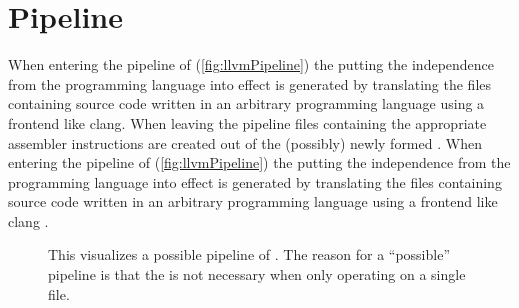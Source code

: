 \section{Pipeline}
When entering the pipeline of \llvm (\autoref{fig:llvmPipeline}) the \llvmir putting the independence from the programming language into effect is generated by translating the files containing source code written in an arbitrary programming language using a frontend like clang.
When leaving the pipeline files containing the appropriate assembler instructions are created out of the (possibly) newly formed \llvmir. \cite{IntroLLVM}
When entering the pipeline of \llvm (\autoref{fig:llvmPipeline}) the \llvmir putting the independence from the programming language into effect is generated by translating the files containing source code written in an arbitrary programming language using a frontend like clang \cite{clang}.
\begin{figure}[!ht]
    \caption[A possible pipeline of LLVM]{
        This visualizes a possible pipeline of \llvm.
        The reason for a \enquote{possible} pipeline is that the \linker is not necessary when only operating on a single \llvmir file.\tikzlegend
    }
    \label{fig:llvmPipeline}
    \centering
\end{figure}
